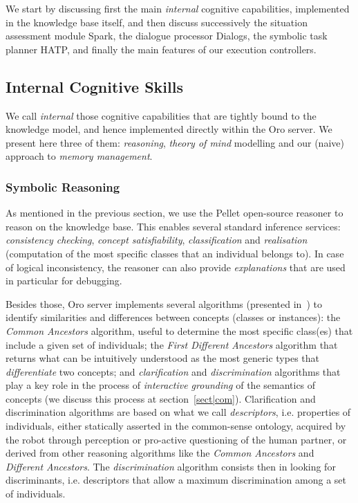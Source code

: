 \documentclass[preprint,3p,times]{elsarticle}
\newcommand{\ie}{{i.e.\xspace}}
\begin{document}
We start by discussing first the main \emph{internal} cognitive capabilities,
implemented in the knowledge base itself, and then discuss successively the
situation assessment module {\sc Spark}, the dialogue processor {\sc Dialogs},
the symbolic task planner HATP, and finally the main features of our execution
controllers.

\subsection{Internal Cognitive Skills}
\label{sect|intern}

We call \emph{internal} those cognitive capabilities that are tightly bound to
the knowledge model, and hence implemented directly within the {\sc Oro} server.
We present here three of them: \emph{reasoning}, \emph{theory of mind} modelling
and our (naive) approach to \emph{memory management}.

\subsubsection{Symbolic Reasoning}
\label{reasoning}

As mentioned in the previous section, we use the Pellet open-source reasoner to
reason on the knowledge base. This enables several standard inference services:
\emph{consistency checking}, \emph{concept satisfiability},
\emph{classification} and \emph{realisation} (computation of the most specific
classes that an individual belongs to). In case of logical inconsistency, the
reasoner can also provide \emph{explanations} that are used in particular for
debugging.

Besides those, {\sc Oro} server implements several algorithms (presented
in~\cite{Ros2010b}) to identify
similarities and differences between concepts (classes or
instances): the \emph{Common Ancestors} algorithm, useful to
determine the most specific class(es) that include a given set of individuals;
the \emph{First Different Ancestors} algorithm that returns what can be
intuitively understood as the most generic types that \emph{differentiate} two
concepts; and \emph{clarification} and \emph{discrimination} algorithms that
play a key role in the process of \emph{interactive grounding} of the semantics
of concepts (we discuss this process at section~\ref{sect|com}). Clarification
and discrimination algorithms are based on what we call \emph{descriptors}, \ie
properties of individuals, either statically asserted in the common-sense
ontology, acquired by the robot through perception or pro-active questioning of
the human partner, or derived from other reasoning algorithms like the
\emph{Common Ancestors} and \emph{Different Ancestors}. The
\emph{discrimination} algorithm consists then in looking for discriminants, \ie
descriptors that allow a maximum discrimination among a set of individuals.
\end{document}
